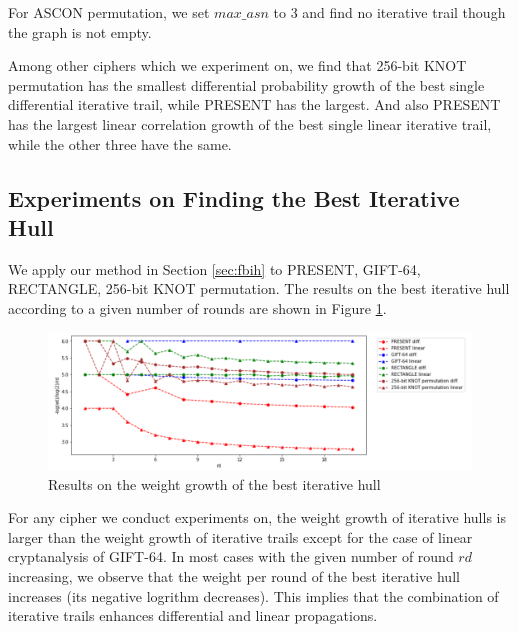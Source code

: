 For ASCON permutation, we set $max\_asn$ to 3 and find no iterative trail though the graph is not empty. 

Among other ciphers which we experiment on, we find that 256-bit KNOT permutation has the smallest differential probability growth of the best single differential iterative trail, while PRESENT has the largest. And also PRESENT has the largest linear correlation growth of the best single linear iterative trail, while the other three have the same. 

\subsection{Experiments on Finding the Best Iterative Hull}

We apply our method in Section \ref{sec:fbih} to PRESENT, GIFT-64, RECTANGLE, 256-bit KNOT permutation. The results on the best iterative hull according to a given number of rounds are shown in Figure \ref{fig:plot_ih}. 

\begin{figure}
	\centering
	\includegraphics[width=1\textwidth]{fig/plot_iterative_hulls.PNG}
	\caption{Results on the weight growth of the best iterative hull} \label{fig:plot_ih}
\end{figure}

For any cipher we conduct experiments on, the weight growth of iterative hulls is larger than the weight growth of iterative trails except for the case of linear cryptanalysis of GIFT-64. In most cases with the given number of round $rd$ increasing, we observe that the weight per round of the best iterative hull increases (its negative logrithm decreases). This implies that the combination of iterative trails enhances differential and linear propagations. 



